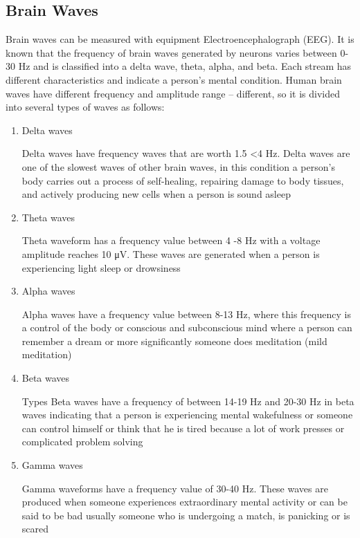 \subsection{Brain Waves}
Brain waves can be measured with equipment Electroencephalograph (EEG). It is known that the frequency of brain waves generated by neurons varies between 0-30 Hz and is classified into a delta wave, theta, alpha, and beta. Each stream has different characteristics and indicate a person's mental condition. Human brain waves have different frequency and amplitude range – different\cite{liu2015plasticity}, so it is divided into several types of waves as follows:

\begin{enumerate}
    \item Delta waves
    \par
   Delta waves have frequency waves that are worth 1.5 <4 Hz. Delta waves are one of the slowest waves of other brain waves, in this condition a person's body carries out a process of self-healing, repairing damage to body tissues, and actively producing new cells when a person is sound asleep\cite{assenza2015wakefulness}
   
    \item Theta waves
    \par
    Theta waveform has a frequency value between 4 -8 Hz with a voltage amplitude reaches 10 μV. These waves are generated when a person is experiencing light sleep or drowsiness\cite{chiu2015complexity}
    
    \item Alpha waves
    \par
   Alpha waves have a frequency value between 8-13 Hz, where this frequency is a control of the body or conscious and subconscious mind where a person can remember a dream or more significantly someone does meditation (mild meditation)\cite{okumura2006amplitude}
   
    \item Beta waves
    \par
   Types Beta waves have a frequency of between 14-19 Hz and 20-30 Hz in beta waves indicating that a person is experiencing mental wakefulness or someone can control himself or think that he is tired because a lot of work presses or complicated problem solving\cite{malik2018brain}
   
    \item Gamma waves
    \par
    Gamma waveforms have a frequency value of 30-40 Hz. These waves are produced when someone experiences extraordinary mental activity or can be said to be bad usually someone who is undergoing a match, is panicking or is scared\cite{martini2018spatial}
    

\end{enumerate}
